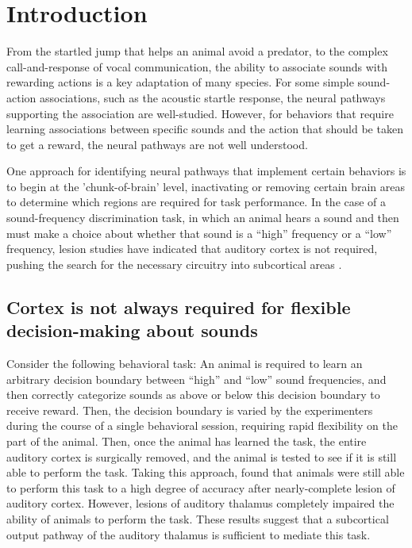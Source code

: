 \chapter{Introduction}

From the startled jump that helps an animal avoid a predator, to the complex call-and-response of vocal communication, the ability to associate sounds with rewarding actions is a key adaptation of many species. 
For some simple sound-action associations, such as the acoustic startle response, the neural pathways supporting the association are well-studied. 
However, for behaviors that require learning associations between specific sounds and the action that should be taken to get a reward, the neural pathways are not well understood. 

One approach for identifying neural pathways that implement certain behaviors is to begin at the 'chunk-of-brain' level, inactivating or removing certain brain areas to determine which regions are required for task performance.
In the case of a sound-frequency discrimination task, in which an animal hears a sound and then must make a choice about whether that sound is a ``high'' frequency or a ``low'' frequency, lesion studies have indicated that auditory cortex is not required, pushing the search for the necessary circuitry into subcortical areas \citep{Gimenez2015}.

\section{Cortex is not always required for flexible decision-making about sounds}

Consider the following behavioral task: An animal is required to learn an arbitrary decision boundary between ``high'' and ``low'' sound frequencies, and then correctly categorize sounds as above or below this decision boundary to receive reward.
Then, the decision boundary is varied by the experimenters during the course of a single behavioral session, requiring rapid flexibility on the part of the animal.
Then, once the animal has learned the task, the entire auditory cortex is surgically removed, and the animal is tested to see if it is still able to perform the task.
Taking this approach, \citet{Gimenez2015} found that animals were still able to perform this task to a high degree of accuracy after nearly-complete lesion of auditory cortex.
However, lesions of auditory thalamus completely impaired the ability of animals to perform the task. 
These results suggest that a subcortical output pathway of the auditory thalamus is sufficient to mediate this task.

